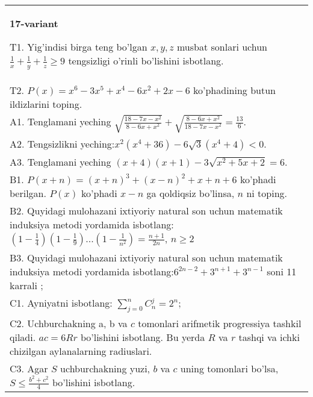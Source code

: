 \documentclass{article}
\begin{document}
\begin{tabular}{m{17cm}}
\textbf{17-variant}
\newline

T1. Yig'indisi birga teng bo'lgan \(x,y,z\) musbat sonlari uchun \(\frac{1}{x} + \frac{1}{y} + \frac{1}{z} \geq 9\) tengsizligi o'rinli bo'lishini isbotlang. \\
T2. \(P(x) = x^{6} - 3x^{5} + x^{4} - 6x^{2} + 2x - 6\) ko'phadining butun ildizlarini toping. \\
A1. Tenglamani yeching \(\sqrt{\frac{18 - 7x - x^{2}}{8 - 6x + x^{2}}} + \sqrt{\frac{8 - 6x + x^{2}}{18 - 7x - x^{2}}} = \frac{13}{6}\). \\
A2. Tengsizlikni yeching:\(x^{2}\left( x^{4} + 36 \right) - 6\sqrt{3}\left( x^{4} + 4 \right) < 0\). \\
A3. Tenglamani yeching \((x + 4)(x + 1) - 3\sqrt{x^{2} + 5x + 2} = 6\). \\
B1. \(P(x + n) = (x + n)^{3} + (x - n)^{2} + x + n + 6\) ko'phadi berilgan. \(P(x)\) ko'phadi \(x - n\) ga qoldiqsiz bo'linsa, \(n\) ni toping. \\
B2. Quyidagi mulohazani ixtiyoriy natural son uchun matematik induksiya metodi yordamida isbotlang: \(\left( 1 - \frac{1}{4} \right)\left( 1 - \frac{1}{9} \right)...\left( 1 - \frac{1}{n^{2}} \right) = \frac{n + 1}{2n}\), \(n \geq 2\) \\
B3. Quyidagi mulohazani ixtiyoriy natural son uchun matematik induksiya metodi yordamida isbotlang:\(6^{2n - 2} + 3^{n + 1} + 3^{n - 1}\) soni 11 karrali ; \\
C1. Ayniyatni isbotlang: \(\sum_{j = 0}^{n}C_{n}^{j} = 2^{n}\); \\
C2. Uchburchakning a, b va \(c\) tomonlari arifmetik progressiya tashkil qiladi. \(ac = 6Rr\) bo'lishini isbotlang. Bu yerda \(R\) va \(r\) tashqi va ichki chizilgan aylanalarning radiuslari. \\
C3. Agar \(S\) uchburchakning yuzi, \(b\) va \(c\) uning tomonlari bo'lsa, \(S \leq \frac{b^{2} + c^{2}}{4}\) bo'lishini isbotlang. \\

\end{tabular}
\vspace{1cm}
\end{document}
